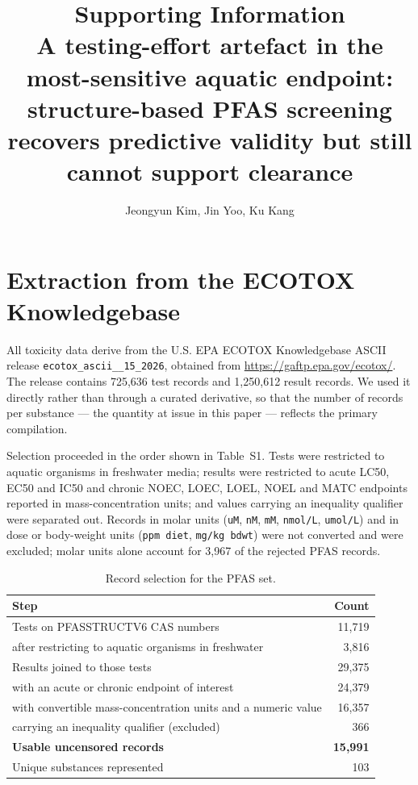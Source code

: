 \documentclass[11pt]{article}
\title{\vspace{-2em}Supporting Information\\[0.4em]
\large A testing-effort artefact in the most-sensitive aquatic endpoint:
structure-based PFAS screening recovers predictive validity but still cannot
support clearance}
\author{Jeongyun Kim, Jin Yoo, Ku Kang}
\date{}
\begin{document}
\maketitle

\section{Extraction from the ECOTOX Knowledgebase}

All toxicity data derive from the U.S. EPA ECOTOX Knowledgebase ASCII release
\texttt{ecotox\_\allowbreak ascii\_\_15\_2026}, obtained from
\sloppy\url{https://gaftp.epa.gov/ecotox/}\fussy. The release contains 725{,}636 test records
and 1{,}250{,}612 result records. We used it directly rather than through a
curated derivative, so that the number of records per substance --- the quantity
at issue in this paper --- reflects the primary compilation.

Selection proceeded in the order shown in Table~S1. Tests were restricted to
aquatic organisms in freshwater media; results were restricted to acute LC50,
EC50 and IC50 and chronic NOEC, LOEC, LOEL, NOEL and MATC endpoints reported in
mass-concentration units; and values carrying an inequality qualifier were
separated out. Records in molar units (\texttt{uM}, \texttt{nM},
\texttt{mM}, \texttt{nmol/L}, \texttt{umol/L}) and in dose or body-weight units
(\texttt{ppm diet}, \texttt{mg/kg bdwt}) were not converted and were excluded;
molar units alone account for 3{,}967 of the rejected PFAS records.

\begin{table}[h]
\centering
\caption{Record selection for the PFAS set.}
\small
\begin{tabular}{lr}
\toprule
Step & Count \\
\midrule
Tests on PFASSTRUCTV6 CAS numbers & 11{,}719 \\
\quad after restricting to aquatic organisms in freshwater & 3{,}816 \\
Results joined to those tests & 29{,}375 \\
\quad with an acute or chronic endpoint of interest & 24{,}379 \\
\quad with convertible mass-concentration units and a numeric value & 16{,}357 \\
\quad carrying an inequality qualifier (excluded) & 366 \\
\textbf{Usable uncensored records} & \textbf{15{,}991} \\
Unique substances represented & 103 \\
\bottomrule
\end{tabular}
\end{table}
\end{document}

